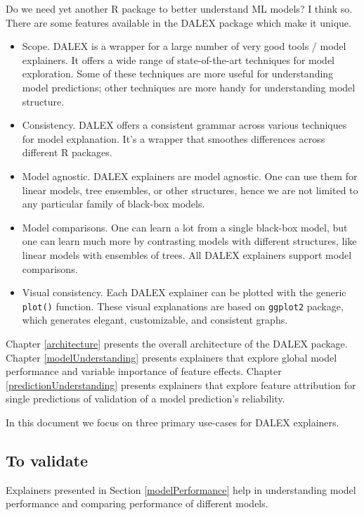 \documentclass[]{book}
\providecommand{\tightlist}{%
  \setlength{\itemsep}{0pt}\setlength{\parskip}{0pt}}
\theoremstyle{definition}
\theoremstyle{definition}
\theoremstyle{definition}
\theoremstyle{remark}
\begin{document}
Do we need yet another R package to better understand ML models? I think
so. There are some features available in the DALEX package which make it
unique.

\begin{itemize}
\tightlist
\item
  Scope. DALEX is a wrapper for a large number of very good tools /
  model explainers. It offers a wide range of state-of-the-art
  techniques for model exploration. Some of these techniques are more
  useful for understanding model predictions; other techniques are more
  handy for understanding model structure.
\item
  Consistency. DALEX offers a consistent grammar across various
  techniques for model explanation. It's a wrapper that smoothes
  differences across different R packages.
\item
  Model agnostic. DALEX explainers are model agnostic. One can use them
  for linear models, tree ensembles, or other structures, hence we are
  not limited to any particular family of black-box models.
\item
  Model comparisons. One can learn a lot from a single black-box model,
  but one can learn much more by contrasting models with different
  structures, like linear models with ensembles of trees. All DALEX
  explainers support model comparisons.
\item
  Visual consistency. Each DALEX explainer can be plotted with the
  generic \texttt{plot()} function. These visual explanations are based
  on \texttt{ggplot2} \citep{ggplot2} package, which generates elegant,
  customizable, and consistent graphs.
\end{itemize}

Chapter \ref{architecture} presents the overall architecture of the
DALEX package. Chapter \ref{modelUnderstanding} presents explainers that
explore global model performance and variable importance of feature
effects. Chapter \ref{predictionUnderstanding} presents explainers that
explore feature attribution for single predictions of validation of a
model prediction's reliability.

In this document we focus on three primary use-cases for DALEX
explainers.

\hypertarget{to-validate}{%
\subsection{To validate}\label{to-validate}}

Explainers presented in Section \ref{modelPerformance} help in
understanding model performance and comparing performance of different
models.
\end{document}
